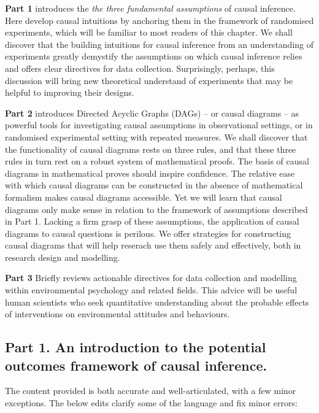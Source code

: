 \documentclass[
  singlecolumn]{article}
\begin{document}
\textbf{Part 1} introduces the \emph{the three fundamental assumptions}
of causal inference. Here develop causal intuitions by anchoring them in
the framework of randomised experiments, which will be familiar to most
readers of this chapter. We shall discover that the building intuitions
for causal inference from an understanding of experiments greatly
demystify the assumptions on which causal inference relies and offers
clear directives for data collection. Surprisingly, perhaps, this
discussion will bring new theoretical understand of experiments that may
be helpful to improving their designs.

\textbf{Part 2} introduces Directed Acyclic Graphs (DAGs) -- or causal
diagrams -- as powerful tools for investigating causal assumptions in
observational settings, or in randomised experimental setting with
repeated measures. We shall discover that the functionality of causal
diagrams rests on three rules, and that these three rules in turn rest
on a robust system of mathematical proofs. The basis of causal diagrams
in mathematical proves should inspire confidence. The relative ease with
which causal diagrams can be constructed in the absence of mathematical
formalism makes causal diagrams accessible. Yet we will learn that
causal diagrams only make sense in relation to the framework of
assumptions described in Part 1. Lacking a firm grasp of these
assumptions, the application of causal diagrams to causal questions is
perilous. We offer strategies for constructing causal diagrams that will
help reserach use them safely and effectively, both in research design
and modelling.

\textbf{Part 3} Briefly reviews actionable directives for data
collection and modelling within environmental psychology and related
fields. This advice will be useful human scientists who seek
quantitative understanding about the probable effects of interventions
on environmental attitudes and behaviours.

\hypertarget{part-1.-an-introduction-to-the-potential-outcomes-framework-of-causal-inference.}{%
\subsection{Part 1. An introduction to the potential outcomes framework
of causal
inference.}\label{part-1.-an-introduction-to-the-potential-outcomes-framework-of-causal-inference.}}

The content provided is both accurate and well-articulated, with a few
minor exceptions. The below edits clarify some of the language and fix
minor errors:
\end{document}
